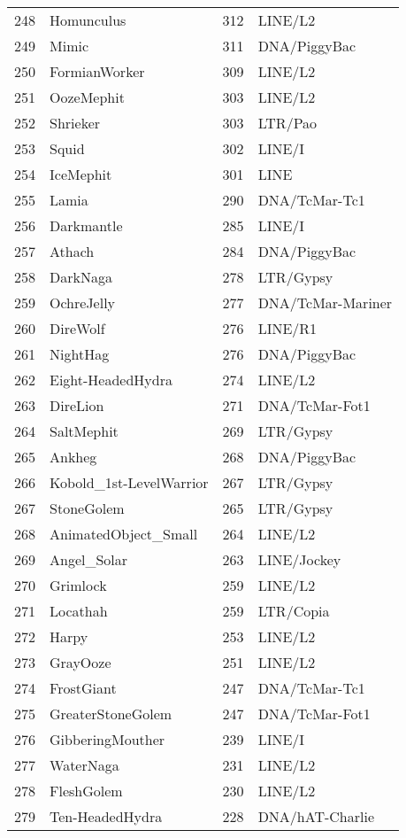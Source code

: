 \begin{table}[ht]
\begin{tabular}{rlrl}
  248 & Homunculus & 312 & LINE/L2  \\ 
  249 & Mimic & 311 & DNA/PiggyBac  \\ 
  250 & FormianWorker & 309 & LINE/L2  \\ 
  251 & OozeMephit & 303 & LINE/L2  \\ 
  252 & Shrieker & 303 & LTR/Pao  \\ 
  253 & Squid & 302 & LINE/I  \\ 
  254 & IceMephit & 301 & LINE  \\ 
  255 & Lamia & 290 & DNA/TcMar-Tc1  \\ 
  256 & Darkmantle & 285 & LINE/I  \\ 
  257 & Athach & 284 & DNA/PiggyBac  \\ 
  258 & DarkNaga & 278 & LTR/Gypsy  \\ 
  259 & OchreJelly & 277 & DNA/TcMar-Mariner  \\ 
  260 & DireWolf & 276 & LINE/R1  \\ 
  261 & NightHag & 276 & DNA/PiggyBac  \\ 
  262 & Eight-HeadedHydra & 274 & LINE/L2  \\ 
  263 & DireLion & 271 & DNA/TcMar-Fot1  \\ 
  264 & SaltMephit & 269 & LTR/Gypsy  \\ 
  265 & Ankheg & 268 & DNA/PiggyBac  \\ 
  266 & Kobold\_1st-LevelWarrior & 267 & LTR/Gypsy  \\ 
  267 & StoneGolem & 265 & LTR/Gypsy  \\ 
  268 & AnimatedObject\_Small & 264 & LINE/L2  \\ 
  269 & Angel\_Solar & 263 & LINE/Jockey  \\ 
  270 & Grimlock & 259 & LINE/L2  \\ 
  271 & Locathah & 259 & LTR/Copia  \\ 
  272 & Harpy & 253 & LINE/L2  \\ 
  273 & GrayOoze & 251 & LINE/L2  \\ 
  274 & FrostGiant & 247 & DNA/TcMar-Tc1  \\ 
  275 & GreaterStoneGolem & 247 & DNA/TcMar-Fot1  \\ 
  276 & GibberingMouther & 239 & LINE/I  \\ 
  277 & WaterNaga & 231 & LINE/L2  \\ 
  278 & FleshGolem & 230 & LINE/L2  \\ 
  279 & Ten-HeadedHydra & 228 & DNA/hAT-Charlie  \\ 

\end{tabular}
\end{table}
